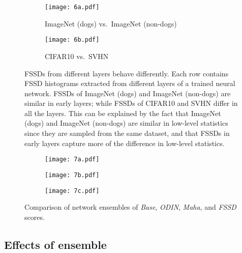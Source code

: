 \documentclass[letterpaper]{article}
\begin{document}
\begin{figure*}
\centering
\begin{subfigure}{\textwidth}
  \centering
\texttt{[image: 6a.pdf]}  
  \caption{ImageNet (dogs) vs.\ ImageNet (non-dogs)}
\end{subfigure}
\begin{subfigure}{\textwidth}
  \centering
\texttt{[image: 6b.pdf]}  
  \caption{CIFAR10 vs.\ SVHN}
\end{subfigure}
\caption{FSSDs from different layers behave differently. Each row contains FSSD histograms extracted from different layers of a trained neural network. FSSDs of ImageNet (dogs) and ImageNet (non-dogs) are similar in early layers; while FSSDs of CIFAR10 and SVHN differ in all the layers. This can be explained by the fact that ImageNet (dogs) and ImageNet (non-dogs) are similar in low-level statistics since they are sampled from the same dataset, and that FSSDs in early layers capture more of the difference in low-level statistics.}
\label{fig:layer_ensemble}
\end{figure*}
\begin{figure*}[h]
    \centering
\begin{subfigure}{0.3\textwidth}
         \centering
         \texttt{[image: 7a.pdf]}
\label{dataset2}
    \end{subfigure}
    \begin{subfigure}{.3\textwidth}
         \centering
         \texttt{[image: 7b.pdf]}
\label{dataset2}
    \end{subfigure}
    \begin{subfigure}{.3\textwidth}
         \centering
         \texttt{[image: 7c.pdf]}
\label{dataset2}
    \end{subfigure}
\caption{Comparison of network ensembles of \textit{Base}, \textit{ODIN}, \textit{Maha}, and \textit{FSSD} scores.
}
    \label{ensemble}
\end{figure*}

\subsection{Effects of ensemble}
\end{document}
